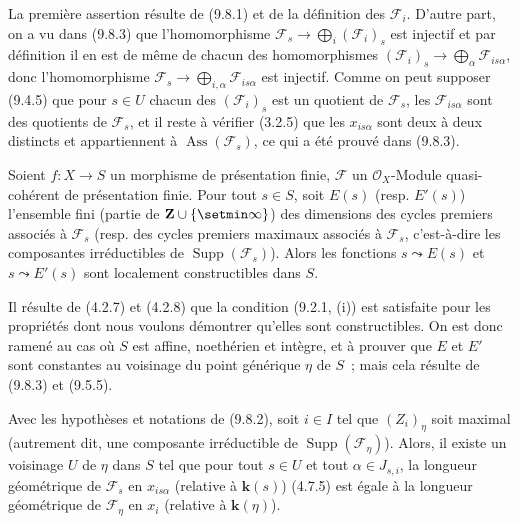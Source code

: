 La première assertion résulte de (9.8.1) et de la définition des
$\mathcal F_i$. D'autre part, on a vu dans (9.8.3) que l'homomorphisme
$\mathcal F_s\to\bigoplus_i(\mathcal F_i)_s$ est injectif et par définition il
en est de même de chacun des homomorphismes
$(\mathcal F_i)_s\to\bigoplus_\alpha\mathcal F_{is\alpha}$, donc
l'homomorphisme $\mathcal F_s\to\bigoplus_{i,\alpha}\mathcal F_{is\alpha}$ est
injectif. Comme on peut supposer (9.4.5) que pour $s\in U$ chacun des
$(\mathcal F_i)_s$ est un quotient de $\mathcal F_s$, les
$\mathcal F_{is\alpha}$ sont des quotients de $\mathcal F_s$, et il reste à
vérifier (3.2.5) que les $x_{is\alpha}$ sont deux à deux distincts et
appartiennent à $\operatorname{Ass}(\mathcal F_s)$, ce qui a été prouvé dans
(9.8.3).

\begin{proposition}[9.8.5]
\label{IV.9.8.5-fr}
Soient $f:X\to S$ un morphisme de présentation finie, $\mathcal F$ un
$\mathcal O_X$-Module quasi-cohérent de présentation finie. Pour tout $s\in S$,
soit $E(s)$ \textup{(resp. $E'(s)$)} l'ensemble fini (partie de
$\mathbf Z\cup\{\setmin\infty\}$) des dimensions des cycles premiers associés à
$\mathcal F_s$ \textup{(resp.} des cycles premiers maximaux associés à $\mathcal F_s$,
c'est-à-dire les composantes irréductibles de $\operatorname{Supp}(\mathcal F_s)$\textup{)}.
Alors les fonctions $s\leadsto E(s)$ et $s\leadsto E'(s)$ sont localement
constructibles dans $S$.
\end{proposition}


Il résulte de (4.2.7) et (4.2.8) que la condition (9.2.1, (i)) est satisfaite
pour les propriétés dont nous voulons démontrer qu'elles sont constructibles.
On est donc ramené au cas où $S$ est affine, noethérien et intègre, et à prouver
que $E$ et $E'$ sont constantes au voisinage du point générique $\eta$ de $S$~;
mais cela résulte de (9.8.3) et (9.5.5).

\begin{proposition}[9.8.6]
\label{IV.9.8.6-fr}
Avec les hypothèses et notations de \textup{(9.8.2)}, soit $i\in I$ tel que $(Z_i)_\eta$
soit maximal (autrement dit, une composante irréductible de
$\operatorname{Supp}(\mathcal F_\eta)$). Alors, il existe un voisinage $U$ de
$\eta$ dans $S$ tel que pour tout $s\in U$ et tout $\alpha\in J_{s,i}$, la
longueur géométrique de $\mathcal F_s$ en $x_{is\alpha}$ (relative à
$\boldsymbol{k}(s)$) \textup{(4.7.5)} est égale à la longueur géométrique de
$\mathcal F_\eta$ en $x_i$ (relative à $\boldsymbol{k}(\eta)$).
\end{proposition}

